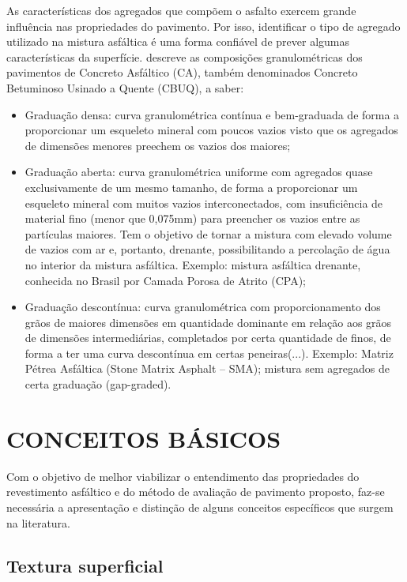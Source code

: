 As características dos agregados que compõem o asfalto exercem grande influência nas propriedades do pavimento. Por isso, identificar o tipo de agregado utilizado na mistura asfáltica é uma forma confiável de prever algumas características da superfície.  descreve as composições granulométricas dos pavimentos de Concreto Asfáltico (CA), também denominados Concreto Betuminoso Usinado a Quente (CBUQ), a saber:
\begin{itemize}
\item Graduação densa: curva granulométrica contínua e bem-graduada de forma a proporcionar um esqueleto mineral com poucos vazios visto que os agregados de dimensões menores preechem os vazios dos maiores; 

\item Graduação aberta: curva granulométrica uniforme com agregados quase exclusivamente de um mesmo tamanho, de forma a proporcionar um esqueleto mineral com muitos vazios interconectados, com insuficiência de material fino (menor que 0,075mm) para preencher os vazios entre as partículas maiores. Tem o objetivo de tornar a mistura com elevado volume de vazios com ar e, portanto, drenante, possibilitando a percolação de água no interior da mistura asfáltica. Exemplo: mistura asfáltica drenante, conhecida no Brasil por Camada Porosa de Atrito (CPA); 

\item Graduação descontínua: curva granulométrica com proporcionamento dos grãos de maiores dimensões em quantidade dominante em relação aos grãos de dimensões intermediárias, completados por certa quantidade de finos, de forma a ter uma curva descontínua em certas peneiras(...). Exemplo: Matriz Pétrea Asfáltica (Stone Matrix Asphalt – SMA); mistura sem agregados de certa graduação (gap-graded). 
\end{itemize}

\section{CONCEITOS BÁSICOS}
Com o objetivo de melhor viabilizar o entendimento das propriedades do revestimento asfáltico e do método de avaliação de pavimento proposto, faz-se necessária a apresentação e distinção de alguns conceitos específicos que surgem na literatura.

\subsection{Textura superficial}

